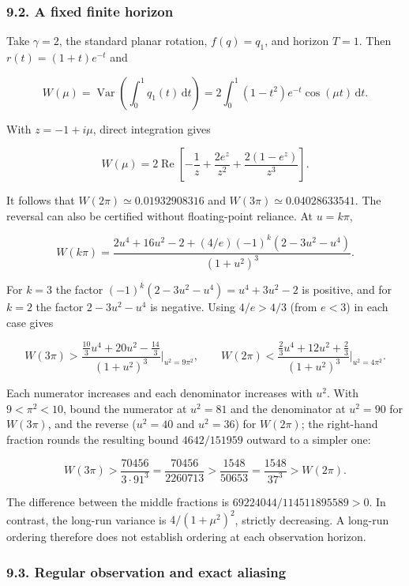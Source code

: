 \documentclass[
  british,
  11pt,
  a4paper,
]{article}
\begin{document}
\subsubsection{9.2. A fixed finite
horizon}\label{a-fixed-finite-horizon}

Take \(\gamma=2\), the standard planar rotation, \(f(q)=q_1\), and
horizon \(T=1\). Then \(r(t)=(1+t)e^{-t}\) and

\[
W(\mu)=\mathop{\mathrm{Var}}\left(\int_0^1q_1(t)\,\mathrm dt\right)
=2\int_0^1(1-t^2)e^{-t}\cos(\mu t)\,\mathrm dt.
\]

With \(z=-1+i\mu\), direct integration gives

\[
W(\mu)=2\mathop{\mathrm{Re}}\left[-\frac1z+\frac{2e^z}{z^2}
+\frac{2(1-e^z)}{z^3}\right]. \tag{30}
\]

It follows that \(W(2\pi)\simeq0.01932908316\) and
\(W(3\pi)\simeq0.04028633541\). The reversal can also be certified
without floating-point reliance. At \(u=k\pi\),

\[
W(k\pi)=
\frac{2u^4+16u^2-2+(4/e)(-1)^k(2-3u^2-u^4)}{(1+u^2)^3}.
\]

For \(k=3\) the factor \((-1)^k(2-3u^2-u^4)=u^4+3u^2-2\) is positive,
and for \(k=2\) the factor \(2-3u^2-u^4\) is negative. Using \(4/e>4/3\)
(from \(e<3\)) in each case gives

\[
W(3\pi)>\frac{\tfrac{10}3u^4+20u^2-\tfrac{14}3}{(1+u^2)^3}\Big|_{u^2=9\pi^2},
\qquad
W(2\pi)<\frac{\tfrac23u^4+12u^2+\tfrac23}{(1+u^2)^3}\Big|_{u^2=4\pi^2}.
\]

Each numerator increases and each denominator increases with \(u^2\).
With \(9<\pi^2<10\), bound the numerator at \(u^2=81\) and the
denominator at \(u^2=90\) for \(W(3\pi)\), and the reverse (\(u^2=40\)
and \(u^2=36\)) for \(W(2\pi)\); the right-hand fraction rounds the
resulting bound \(4642/151959\) outward to a simpler one:

\[
W(3\pi)>\frac{70456}{3\cdot91^3}=\frac{70456}{2260713}
>\frac{1548}{50653}=\frac{1548}{37^3}>W(2\pi).
\]

The difference between the middle fractions is
\(69224044/114511895589>0\). In contrast, the long-run variance is
\(4/(1+\mu^2)^2\), strictly decreasing. A long-run ordering therefore
does not establish ordering at each observation horizon.

\subsubsection{9.3. Regular observation and exact
aliasing}\label{regular-observation-and-exact-aliasing}
\end{document}
